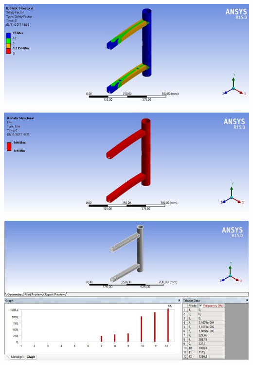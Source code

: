     \begin{center}
    	\includegraphics[scale=0.7]{figuras/fator_seguranca_3}
        \label{fator_seguranca_3}
    \end{center}
    
    \begin{center}
    	\includegraphics[scale=0.7]{figuras/vida_util_3}
        \label{vida_util_3}
    \end{center}

    \begin{center}
    	\includegraphics[scale=0.7]{figuras/vibracao_1}
        \label{vibracao_1}
    \end{center}    
 
